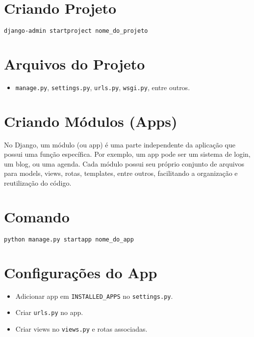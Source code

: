 \section{Criando Projeto}
\texttt{django-admin startproject nome\_do\_projeto}

\section{Arquivos do Projeto}
\begin{itemize}
  \item \texttt{manage.py}, \texttt{settings.py}, \texttt{urls.py}, \texttt{wsgi.py}, entre outros.
\end{itemize}


\section{Criando M\'odulos (Apps)}

No Django, um m\'odulo (ou app) \'{e} uma parte independente da aplica\c{c}\~ao que possui uma fun\c{c}\~ao espec\'ifica. Por exemplo, um app pode ser um sistema de login, um blog, ou uma agenda. Cada m\'odulo possui seu pr\'oprio conjunto de arquivos para models, views, rotas, templates, entre outros, facilitando a organiza\c{c}\~ao e reutiliza\c{c}\~ao do c\'odigo.

\section{Comando}
\texttt{python manage.py startapp nome\_do\_app}

\section{Configura\c{c}\~oes do App}
\begin{itemize}
  \item Adicionar app em \texttt{INSTALLED\_APPS} no \texttt{settings.py}.
  \item Criar \texttt{urls.py} no app.
  \item Criar views no \texttt{views.py} e rotas associadas.
\end{itemize}





